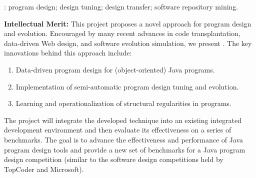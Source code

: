 

\medskip{}: program design; design tuning; 
design transfer; software repository mining.   

\medskip\noindent
{\bf{Intellectual Merit:}} 
% 
This project proposes a novel approach for program design and 
evolution. Encouraged by many recent advances in code transplantation, 
data-driven Web design, and software evolution simulation, we 
present \pdm. The key innovations behind this approach include:

\begin{enumerate}
	\item Data-driven program design for (object-oriented) Java programs.
	\item Implementation of semi-automatic program design tuning and evolution.
	\item Learning and operationalization of structural regularities in programs.
\end{enumerate}

\noindent
The project will integrate the developed \pdm technique into an existing 
integrated development environment and then evaluate its effectiveness 
on a series of benchmarks. The goal is to advance the effectiveness and 
performance of Java program design tools and provide a new set of benchmarks 
for a Java program design competition (similar to the software design 
competitions held by TopCoder and Microsoft).


